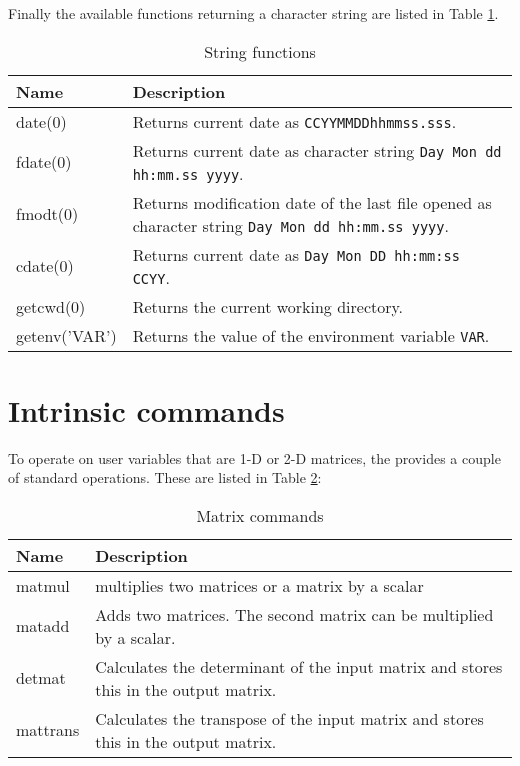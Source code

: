 Finally the available functions returning a character string are
listed in Table \ref{func-char}.

\begin{table}[!tbh]
\centering
\begin{tabularx}{\textwidth}{|p{30mm}|X|}
  \hline
  {\bf Name} & {\bf Description} \\
  \hline\hline
  date(0)        & Returns current date as {\tt CCYYMMDDhhmmss.sss}.\\
  fdate(0)       & Returns current date as character string {\tt Day Mon dd hh:mm.ss yyyy}.\\
  fmodt(0)       & Returns modification date of the last file opened 
                   as character string {\tt Day Mon dd hh:mm.ss yyyy}.\\
  cdate(0)       & Returns current date as {\tt Day Mon DD hh:mm:ss CCYY}.\\
  getcwd(0)      & Returns the current working directory.\\
  getenv('VAR')  & Returns the value of the environment variable
                   {\tt VAR}.\\
  \hline
\end{tabularx}
\caption{\label{func-char}String functions}
\end{table}



\section{Intrinsic commands  \label{cmds}}

To operate on user variables that are 1-D or 2-D matrices, the \Suite 
provides a couple of standard operations. These are listed in Table \ref{cmds-cmds}:

\begin{table}[!tbh]
\centering
\begin{tabularx}{\textwidth}{|p{30mm}|X|}
  \hline
  {\bf Name} & {\bf Description} \\
  \hline\hline
  matmul         & multiplies two matrices or a matrix by a scalar  \\
  matadd         & Adds two matrices. The second matrix can be multiplied by a scalar. \\
  detmat         & Calculates the determinant of the input matrix and stores this in 
                   the output matrix. \\
  mattrans       & Calculates the transpose of the input matrix and stores this in 
                   the output matrix. \\
  \hline
\end{tabularx}
\caption{\label{cmds-cmds}Matrix commands}
\end{table}

